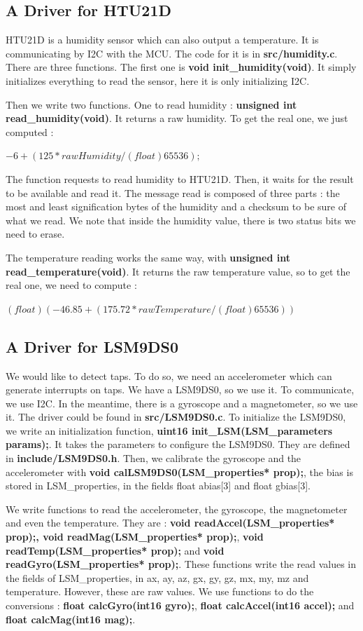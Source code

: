 \subsection{A Driver for HTU21D}

HTU21D is a humidity sensor which can also output a temperature. It is communicating by I2C with the MCU. The code for it is in \textbf{src/humidity.c}. There are three functions. The first one is \textbf{void init\_humidity(void)}. It simply initializes everything to read the sensor, here it is only initializing I2C.

Then we write two functions. One to read humidity : \textbf{unsigned int read\_humidity(void)}. It returns a raw humidity. To get the real one, we just computed :

$ -6 + (125 * rawHumidity / (float)65536); $

The function requests to read humidity to HTU21D. Then, it waits for the result to be available and read it. The message read is composed of three parts : the most and least signification bytes of the humidity and a checksum to be sure of what we read. We note that inside the humidity value, there is two status bits we need to erase.

The temperature reading works the same way, with \textbf{unsigned int read\_temperature(void)}. It returns the raw temperature value, so to get the real one, we need to compute :

$ (float)(-46.85 + (175.72 * rawTemperature / (float)65536)) $

\subsection{A Driver for LSM9DS0}

We would like to detect taps. To do so, we need an accelerometer which can generate interrupts on taps. We have a LSM9DS0, so we use it. To communicate, we use I2C. In the meantime, there is a gyroscope and a magnetometer, so we use it. The driver could be found in \textbf{src/LSM9DS0.c}. To initialize the LSM9DS0, we write an initialization function, \textbf{uint16 init\_LSM(LSM\_parameters params);}. It takes the parameters to configure the LSM9DS0. They are defined in \textbf{include/LSM9DS0.h}. Then, we calibrate the gyroscope and the accelerometer with \textbf{void calLSM9DS0(LSM\_properties* prop);}, the bias is stored in LSM\_properties, in the fields float abias[3] and float gbias[3].

We write functions to read the accelerometer, the gyroscope, the magnetometer and even the temperature. They are : \textbf{void readAccel(LSM\_properties* prop);, void readMag(LSM\_properties* prop);}, \textbf{void readTemp(LSM\_properties* prop);} and \textbf{void readGyro(LSM\_properties* prop);}. These functions write the read values in the fields of LSM\_properties, in ax, ay, az, gx, gy, gz, mx, my, mz and temperature. However, these are raw values. We use functions to do the conversions : \textbf{float calcGyro(int16 gyro);}, \textbf{float calcAccel(int16 accel);} and\textbf{ float calcMag(int16 mag);}.

